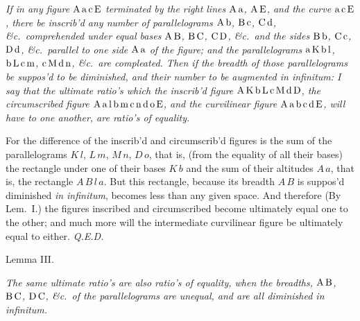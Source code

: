 {\it
If in any figure ${\rm A} \, {\rm a} \, {\rm c} \, {\rm E}$
terminated by the right lines ${\rm A} \, {\rm a}$,
${\rm A} \, {\rm E}$, and the curve
${\rm a} \, {\rm c} \, {\rm E}$, there be inscrib'd any number of
parallelograms ${\rm A} \, {\rm b}$, ${\rm B} \, {\rm c}$,
${\rm C} \, {\rm d}$, \&c.\ comprehended under equal bases
${\rm A} \, {\rm B}$, ${\rm B} \, {\rm C}$, ${\rm C} \, {\rm D}$,
\&c.\ and the sides
${\rm B} \, {\rm b}$, ${\rm C} \, {\rm c}$, ${\rm D} \, {\rm d}$,
\&c.\ parallel to one side ${\rm A} \, {\rm a}$ of the figure;
and the parallelograms
${\rm a} \, {\rm K} \, {\rm b} \, {\rm l}$, ${\rm b} \,
   {\rm L} \, {\rm c} \, {\rm m}$,
${\rm c} \, {\rm M} \, {\rm d} \, {\rm n}$, \&c.\ are compleated.
Then if the breadth of those parallelograms be suppos'd to be
diminished, and their number to be augmented\/ {\rm in
infinitum:} I say that the ultimate ratio's which the inscrib'd
figure
${\rm A} \, {\rm K} \, {\rm b} \, {\rm L} \, {\rm c} \, {\rm M} \,
   {\rm d} \, {\rm D}$,
the circumscribed figure
${\rm A} \, {\rm a} \, {\rm l} \, {\rm b} \, {\rm m} \, {\rm c} \,
   {\rm n} \, {\rm d} \, {\rm o} \, {\rm E}$,
and the curvilinear figure
${\rm A} \, {\rm a} \, {\rm b} \, {\rm c} \, {\rm d} \, {\rm E}$,
will have to one another, are ratio's of equality.}

\midinsert
\centerline{}
\endinsert

\bigbreak

For the difference of the inscrib'd and circumscrib'd figures is
the sum of the parallelograms $K \, l$, $L \, m$, $M \, n$,
$D \, o$, that is, (from the equality of all their bases) the
rectangle under one of their bases $K \, b$ and the sum of their
altitudes $A \, a$, that is, the rectangle $A \, B \, l \, a$.
But this rectangle, because its breadth $A \, B$ is suppos'd
diminished {\it in infinitum}, becomes less than any given space.
And therefore (By Lem.~I.) the figures inscribed and
circumscribed become ultimately equal one to the other; and much
more will the intermediate curvilinear figure be ultimately equal
to either.
{\it Q.E.D.}

\bigbreak

\centerline{\largesc Lemma III.}

\nobreak\bigskip

{\it
The same ultimate ratio's are also ratio's of equality, when the
breadths, ${\rm A} \, {\rm B}$, ${\rm B} \, {\rm C}$,
${\rm D} \, {\rm C}$, \&c.\ of the parallelograms are unequal,
and are all diminished\/ {\rm in infinitum.}}

